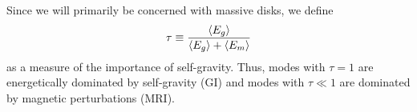 Since we will primarily be concerned with massive disks, we define
\begin{align}
  \tau \equiv \frac{\langle{E_g}\rangle}{\langle{E_g}\rangle + \langle{E_m}\rangle} 
\end{align} 
as a measure of the importance of self-gravity. Thus, modes with $\tau
= 1$ are energetically dominated by self-gravity (GI) and modes with
$\tau\ll1$ are dominated by magnetic perturbations (MRI).   


